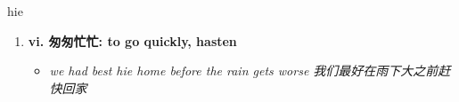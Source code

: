 
\begin{frame}
{\huge hie}
\begin{center}
\begin{enumerate}\Large
  \item \textbf{vi. 匆匆忙忙: to go quickly, hasten}
  \begin{itemize}
    \item \em{\Large{we had best hie home before the rain gets worse 我们最好在雨下大之前赶快回家}}
  \end{itemize}
\end{enumerate}
\end{center}
\end{frame}
